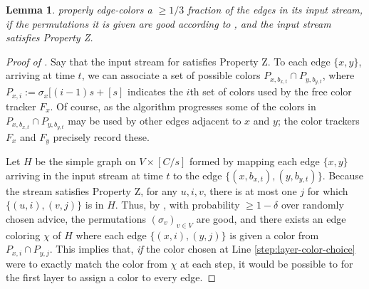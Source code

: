 \documentclass[10pt]{article}
\newtheorem{lemma}[theorem]{Lemma}
\theoremstyle{definition}\newtheorem{definition}[lemma]{Definition}
\theoremstyle{remark}  \newtheorem*{remark}{Remark}
\begin{document}
\begin{lemma}\label{lem:ea-partial-coloring}
    properly edge-colors a $\ge 1/3$ fraction of the edges in its input stream, if the permutations it is given are good according to , and the input stream satisfies Property Z. 
\end{lemma}

\begin{proof}[Proof of ]
  Say that the input stream for  satisfies Property Z. To each edge $\{x,y\}$, arriving at time $t$, we can associate a set of possible colors $P_{x,b_{x,t}} \cap P_{y,b_{y,t}}$, where $P_{x,i} := \sigma_x[(i-1)s + [s]$ indicates the $i$th set of colors used by the free color tracker $F_x$. Of course, as the algorithm progresses some of the colors in $P_{x,b_{x,t}} \cap P_{y,b_{y,t}}$ may be used by other edges adjacent to $x$ and $y$; the color trackers
  $F_x$ and $F_y$ precisely record these.
  
  Let $H$ be the simple graph on $V \times [C/s]$ formed
  by mapping each edge $\{x,y\}$ arriving in the input stream at time $t$ to the edge $\{(x,b_{x,t}),(y,b_{y,t})\}$. Because the stream satisfies Property Z, for any $u,i,v$, there is at most one $j$ for which $\{(u,i),(v,j)\}$ is in $H$. Thus, by , with probability $\ge 1 - \delta$ over randomly chosen advice, the permutations $(\sigma_v)_{v \in V}$ are good, and there exists an edge coloring $\chi$ of $H$ where each edge $\{(x,i),(y,j)\}$ is given a color  from $P_{x,i} \cap P_{y,j}$. This implies that, \emph{if}
  the color chosen at Line \ref{step:layer-color-choice} were to exactly match the color from $\chi$ at each step, it would be possible to for the first layer to assign a color to every edge.
  

\end{proof}
\end{document}
